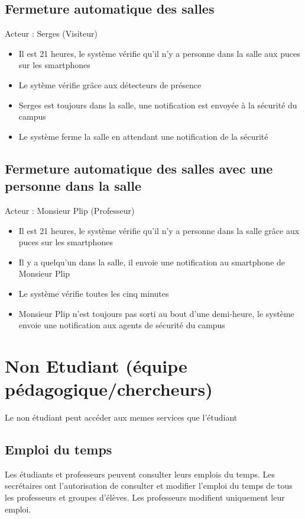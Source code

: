 \subsection*{Fermeture automatique des salles}
Acteur : Serges (Visiteur)
\begin{itemize}
\item Il est 21 heures, le système vérifie qu’il n’y a personne dans la salle aux puces sur les smartphones 
\item Le sytème vérifie grâce aux détecteurs de présence 
\item Serges est toujours dans la salle, une notification est envoyée à la sécurité du campus 
\item Le système ferme la salle en attendant une notification de la sécurité 
\end{itemize}

\subsection*{Fermeture automatique des salles avec une personne dans la salle}
Acteur : Monsieur Plip (Professeur)
\begin{itemize}
\item Il est 21 heures, le système vérifie qu’il n’y a personne dans la salle grâce aux puces sur les smartphones 
\item Il y a quelqu’un dans la salle, il envoie une notification au smartphone de Monsieur Plip 
\item Le système vérifie toutes les cinq minutes 
\item Monsieur Plip n’est toujours pas sorti au bout d’une demi-heure, le système envoie une notification aux agents de sécurité du campus 
\end{itemize}

\newpage

\section{Non Etudiant (équipe pédagogique/chercheurs)}

Le non étudiant peut accéder aux memes services que l’étudiant 

\newpage

\subsection{Emploi du temps}

Les étudiants et professeurs peuvent consulter leurs emplois du temps. Les secrétaires ont l'autorisation de consulter et modifier l'emploi du temps de tous les professeurs et groupes d'élèves. Les professeurs modifient uniquement leur emploi.

